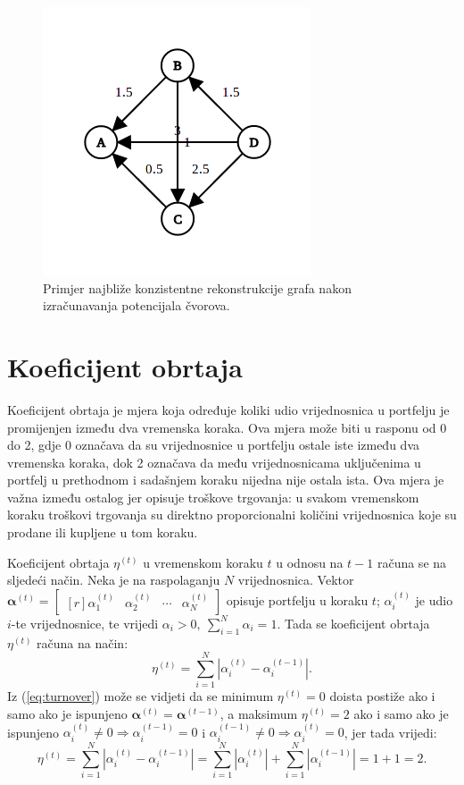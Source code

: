 \documentclass[lmodern, utf8, diplomski, numeric]{fer}
\newcommand{\matr}[1]{\mathbold{#1}}
\newcommand{\q}{\left}
\newcommand{\w}{\right}
\begin{document}
  \begin{figure}[h]
    \centering
    \includegraphics[width=0.5\linewidth]{graphics/graph-eg-2.png}
    \caption{Primjer najbliže konzistentne rekonstrukcije grafa nakon izračunavanja potencijala čvorova.}
    \label{fig:graph-eg-2}
  \end{figure}
  
  \section{Koeficijent obrtaja}
  Koeficijent obrtaja  je mjera koja određuje koliki udio vrijednosnica u portfelju je promijenjen između dva vremenska koraka.
  Ova mjera može biti u rasponu od 0 do 2, gdje 0 označava da su vrijednosnice u portfelju ostale iste između dva vremenska koraka, dok 2 označava da među vrijednosnicama uključenima u portfelj u prethodnom i sadašnjem koraku nijedna nije ostala ista.
  Ova mjera je važna između ostalog jer opisuje troškove trgovanja: u svakom vremenskom koraku troškovi trgovanja su direktno proporcionalni količini vrijednosnica koje su prodane ili kupljene u tom koraku.
  
  Koeficijent obrtaja $\eta^{(t)}$ u vremenskom koraku $t$ u odnosu na $t-1$ računa se na sljedeći način.
  Neka je na raspolaganju $N$ vrijednosnica.
  Vektor $\matr{\alpha}^{(t)} = \begin{bmatrix*}[r] \alpha_1^{(t)} & \alpha_2^{(t)} & \cdots & \alpha_N^{(t)} \end{bmatrix*}$ opisuje portfelju u koraku $t$; $\alpha_i^{(t)}$ je udio $i$-te vrijednosnice, te vrijedi $\alpha_i > 0,\ \sum_{i=1}^{N} \alpha_i = 1$.
  Tada se koeficijent obrtaja $\eta^{(t)}$ računa na način:
  \begin{equation}
  \label{eq:turnover}
  \eta^{(t)} = \sum_{i=1}^{N} \q \lvert \alpha_i^{(t)} - \alpha_i^{(t-1)} \w \rvert.
  \end{equation}
  Iz (\ref{eq:turnover}) može se vidjeti da se minimum $\eta^{(t)} = 0$ doista postiže ako i samo ako je ispunjeno $\matr{\alpha}^{(t)} = \matr{\alpha}^{(t-1)}$,
  a maksimum $\eta^{(t)} = 2$ ako i samo ako je ispunjeno $\alpha_i^{(t)} \ne 0 \Rightarrow \alpha_i^{(t - 1)} = 0$ i $\alpha_i^{(t - 1)} \ne 0 \Rightarrow \alpha_i^{(t)} = 0$, jer tada vrijedi: 
  \begin{equation*}
  \eta^{(t)} = \sum_{i=1}^{N} \q \lvert \alpha_i^{(t)} - \alpha_i^{(t-1)} \w \rvert = \sum_{i=1}^{N} \q \lvert \alpha_i^{(t)}\w \rvert + \sum_{i=1}^N \q \lvert\alpha_i^{(t-1)} \w \rvert = 1 + 1 = 2.
  \end{equation*}
  
\end{document}
